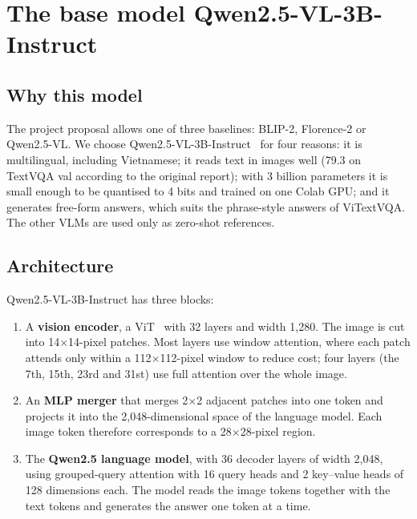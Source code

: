 \section{The base model Qwen2.5-VL-3B-Instruct}
\label{sec:met-baseline}

\subsection{Why this model}

The project proposal allows one of three baselines: BLIP-2, Florence-2 or Qwen2.5-VL. We choose Qwen2.5-VL-3B-Instruct~\cite{bai2025qwen25vl} for four reasons: it is
multilingual, including Vietnamese; it reads text in images well (79.3 on TextVQA val
according to the original report); with 3 billion parameters it is small enough to be
quantised to 4 bits and trained on one Colab GPU; and it generates free-form answers,
which suits the phrase-style answers of ViTextVQA. The other VLMs are used only as
zero-shot references.

\subsection{Architecture}

Qwen2.5-VL-3B-Instruct has three blocks:

\begin{enumerate}
  \item A \textbf{vision encoder}, a ViT~\cite{dosovitskiy2021vit} with 32 layers and
  width 1,280. The image is cut into 14$\times$14-pixel patches. Most layers use window
  attention, where each patch attends only within a 112$\times$112-pixel window to
  reduce cost; four layers (the 7th, 15th, 23rd and 31st) use full attention over the
  whole image.
  \item An \textbf{MLP merger} that merges 2$\times$2 adjacent patches into one token and
  projects it into the 2,048-dimensional space of the language model. Each image token
  therefore corresponds to a 28$\times$28-pixel region.
  \item The \textbf{Qwen2.5 language model}, with 36 decoder layers of width 2,048, using
  grouped-query attention with 16 query heads and 2 key--value heads of 128 dimensions
  each. The model reads the image tokens together with the text tokens and generates the
  answer one token at a time.
\end{enumerate}


